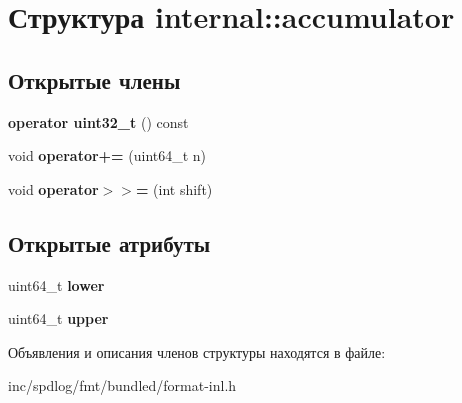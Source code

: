 \hypertarget{structinternal_1_1accumulator}{}\section{Структура internal\+:\+:accumulator}
\label{structinternal_1_1accumulator}
\subsection*{Открытые члены}
\begin{DoxyCompactItemize}
\item 
\mbox{\label{structinternal_1_1accumulator_a0a52f356f517161b34d303c0b761e363}} 
{\bfseries operator uint32\+\_\+t} () const
\item 
\mbox{\label{structinternal_1_1accumulator_a5cb6ee8ea217cd261dbc3f1af02796ba}} 
void {\bfseries operator+=} (uint64\+\_\+t n)
\item 
\mbox{\label{structinternal_1_1accumulator_a37013584704c06c19228bec798b58dbe}} 
void {\bfseries operator$>$$>$=} (int shift)
\end{DoxyCompactItemize}
\subsection*{Открытые атрибуты}
\begin{DoxyCompactItemize}
\item 
\mbox{\label{structinternal_1_1accumulator_a07635c7b8e7fd07749d8dff88b3ba68c}} 
uint64\+\_\+t {\bfseries lower}
\item 
\mbox{\label{structinternal_1_1accumulator_ab3407a35b367d43f6b4a3bed1e923277}} 
uint64\+\_\+t {\bfseries upper}
\end{DoxyCompactItemize}


Объявления и описания членов структуры находятся в файле\+:\begin{DoxyCompactItemize}
\item 
inc/spdlog/fmt/bundled/format-\/inl.\+h\end{DoxyCompactItemize}
